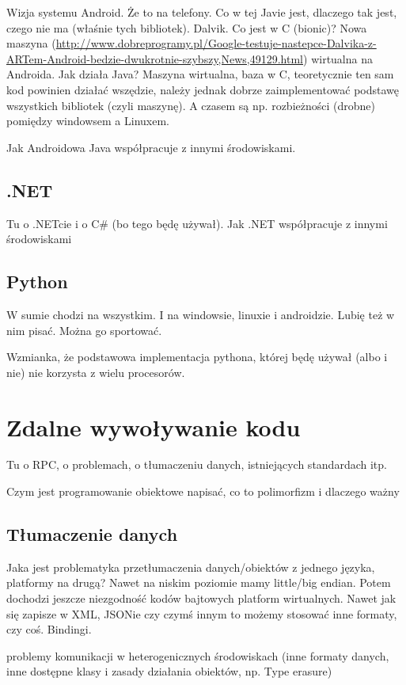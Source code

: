 \documentclass[twoside,a4paper]{book}
\begin{document}
Wizja systemu Android. Że to na telefony. Co w tej Javie jest, dlaczego tak jest, czego nie ma (właśnie tych bibliotek). Dalvik. Co jest w C (bionic)? Nowa maszyna (\url{http://www.dobreprogramy.pl/Google-testuje-nastepce-Dalvika-z-ARTem-Android-bedzie-dwukrotnie-szybszy,News,49129.html}) wirtualna na Androida.
Jak działa Java? Maszyna wirtualna, baza w C, teoretycznie ten sam kod powinien działać wszędzie, należy jednak dobrze zaimplementować podstawę wszystkich bibliotek (czyli maszynę). A czasem są np. rozbieżności (drobne) pomiędzy windowsem a Linuxem.

Jak Androidowa Java współpracuje z innymi środowiskami.

\subsection{.NET}
Tu o .NETcie i o C\# (bo tego będę używał).
Jak .NET współpracuje z innymi środowiskami

\subsection{Python}
W sumie chodzi na wszystkim. I na windowsie, linuxie i androidzie. Lubię też w nim pisać. Można go sportować.

Wzmianka, że podstawowa implementacja pythona, której będę używał (albo i nie) nie korzysta z wielu procesorów.

\section{Zdalne wywoływanie kodu}
Tu o RPC, o problemach, o tłumaczeniu danych, istniejących standardach itp.

Czym jest programowanie obiektowe napisać, co to polimorfizm i dlaczego ważny

\subsection{Tłumaczenie danych}
Jaka jest problematyka przetłumaczenia danych/obiektów z jednego języka, platformy na drugą?
Nawet na niskim poziomie mamy little/big endian. Potem dochodzi jeszcze niezgodność kodów bajtowych platform wirtualnych.
Nawet jak się zapisze w XML, JSONie czy czymś innym to możemy stosować inne formaty, czy coś. Bindingi.

problemy komunikacji w heterogenicznych środowiskach (inne formaty danych, inne dostępne klasy i zasady działania obiektów, np. Type erasure)
\end{document}
